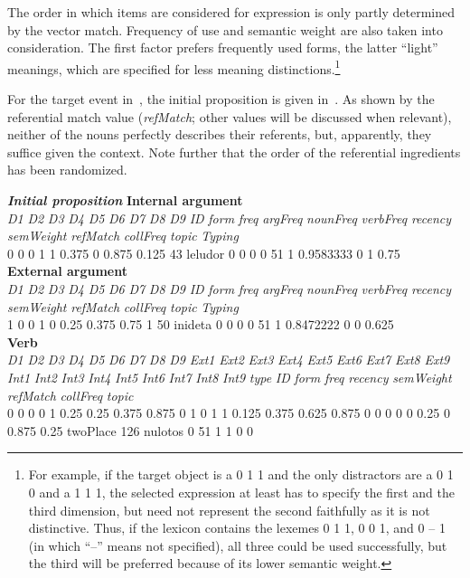 \documentclass[output=paper]{LSP/langsci}
\begin{document}
The order in which items are considered for expression is only partly determined by the vector match. Frequency of use and semantic weight are also taken into consideration. The first factor prefers frequently used forms, the latter ``light'' meanings, which are specified for less meaning distinctions.\footnote{For example, if the target object is a 0 1 1 and the only distractors are a 0 1 0 and a 1 1 1, the selected expression at least has to specify the first and the third dimension, but need not represent the second faithfully as it is not distinctive. Thus, if the lexicon contains the lexemes 0 1 1, 0 0 1, and 0 -- 1 (in which ``--'' means not specified), all three could be used successfully, but the third will be preferred because of its lower semantic weight.} 

\largerpage
For the target event in~, the initial proposition is given in~. As shown by the referential match value (\textit{refMatch}; other values will be discussed when relevant), neither of the nouns perfectly describes their referents, but, apparently, they suffice given the context. Note further that the order of the referential ingredients has been randomized.

\ea\label{17-le-ex:7}
\textit\textbf{Initial proposition}
\ea
\textbf{Internal argument}\\
\gll  \textit{D1} \textit{D2} \textit{D3} \textit{D4} \textit{D5} \textit{D6} \textit{D7} \textit{D8} \textit{D9} \textit{ID} \textit{form} \textit{freq} \textit{argFreq} \textit{nounFreq} \textit{verbFreq} \textit{recency} \textit{semWeight} \textit{refMatch} \textit{collFreq} \textit{topic} \textit{Typing}\\
0 0 0 1 1 0.375 0 0.875 0.125 43 leludor 0 0 0 0 51 1 0.9583333 0 1 0.75\\


\ex
\textbf{External argument}\\
\gll \textit{D1} \textit{D2} \textit{D3} \textit{D4} \textit{D5} \textit{D6} \textit{D7} \textit{D8} \textit{D9} \textit{ID} \textit{form} \textit{freq} \textit{argFreq} \textit{nounFreq} \textit{verbFreq} \textit{recency} \textit{semWeight} \textit{refMatch} \textit{collFreq} \textit{topic} \textit{Typing}\\
1 0 0 1 0 0.25 0.375 0.75 1 50 inideta 0 0 0 0 51 1 0.8472222 0 0 0.625\\
\ex
\textbf{Verb}\\
\gll \textit{D1} \textit{D2} \textit{D3} \textit{D4} \textit{D5} \textit{D6} \textit{D7} \textit{D8} \textit{D9} \textit{Ext1} \textit{Ext2} \textit{Ext3} \textit{Ext4} \textit{Ext5} \textit{Ext6} \textit{Ext7} \textit{Ext8} \textit{Ext9} \textit{Int1} \textit{Int2} \textit{Int3} \textit{Int4} \textit{Int5} \textit{Int6} \textit{Int7} \textit{Int8} \textit{Int9} \textit{type} \textit{ID} \textit{form} \textit{freq} \textit{recency} \textit{semWeight} \textit{refMatch} \textit{collFreq} \textit{topic}\\
0 0 0 0 1 0.25 0.25 0.375 0.875 0 1 0 1 1 0.125 0.375 0.625 0.875 0 0 0 0 0 0.25 0 0.875 0.25 twoPlace 126 nulotos 0 51 1 1 0 0\\
\z
\z
\end{document}
